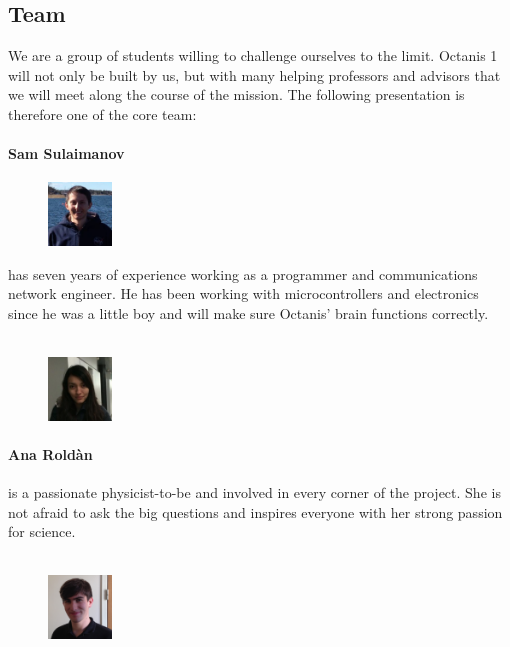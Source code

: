 \documentclass[a4paper,12pt]{article}
\begin{document}
\subsection{Team}

We are a group of students willing to challenge ourselves to the limit. Octanis 1 will not only be built by us, but with many helping professors and advisors that we will meet along the course of the mission. The following presentation is therefore one of the core team:


\paragraph{Sam Sulaimanov} 
\begin{figure}
    \centering
    \vspace{-13pt}
    \includegraphics[width=0.15\textwidth]{sam}
\end{figure} has seven years of experience working as a programmer and communications network engineer. He has been working with microcontrollers and electronics since he was a little boy and will make sure Octanis' brain functions correctly.
\\ \\

\begin{figure}
    \centering
    \vspace{-13pt}
    \includegraphics[width=0.15\textwidth]{ana}
\end{figure}
\paragraph{Ana Roldàn} is a passionate physicist-to-be and involved in every corner of the project. She is not afraid to ask the big questions and inspires everyone with her strong passion for science.
\\ \\

\begin{figure}
     \centering
     \vspace{-13pt}
    \includegraphics[width=0.15\textwidth]{raf}
\end{figure} 
\end{document}
